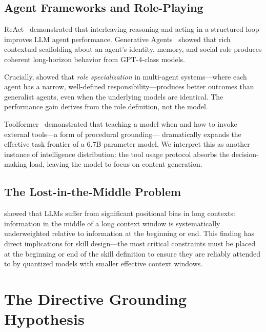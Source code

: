 \documentclass[11pt,a4paper]{article}
\begin{document}
\subsection{Agent Frameworks and Role-Playing}

ReAct~\citep{yao2023react} demonstrated that interleaving reasoning and acting
in a structured loop improves LLM agent performance. Generative
Agents~\citep{park2023generative} showed that rich contextual scaffolding about
an agent's identity, memory, and social role produces coherent long-horizon
behavior from GPT-4-class models.

Crucially, \citet{chen2023agentverse} showed that \emph{role specialization}
in multi-agent systems—where each agent has a narrow, well-defined
responsibility—produces better outcomes than generalist agents, even when the
underlying models are identical. The performance gain derives from the role
definition, not the model.

Toolformer~\citep{schick2023toolformer} demonstrated that teaching a model
when and how to invoke external tools—a form of procedural grounding—
dramatically expands the effective task frontier of a 6.7B parameter model.
We interpret this as another instance of intelligence distribution: the tool
usage protocol absorbs the decision-making load, leaving the model to focus
on content generation.

\subsection{The Lost-in-the-Middle Problem}

\citet{liu2023lost} showed that LLMs suffer from significant positional bias
in long contexts: information in the middle of a long context window is
systematically underweighted relative to information at the beginning or end.
This finding has direct implications for skill design—the most critical
constraints must be placed at the beginning or end of the skill definition
to ensure they are reliably attended to by quantized models with smaller
effective context windows.

\section{The Directive Grounding Hypothesis}
\label{sec:hypothesis}
\end{document}
